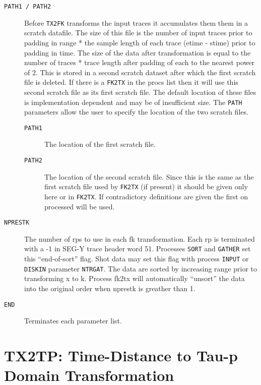 \begin{description}
\item[\texttt{PATH1 / PATH2}] Before \texttt{TX2FK} transforms the input traces it accumulates
         them them in a scratch datafile.  The size of this file is the
         number of input traces prior to padding in range * the sample
         length of each trace (etime - stime) prior to padding in time.
         The size of the data after transformation is equal to the number
         of traces * trace length after padding of each to the nearest
         power of 2. This is stored in a second scratch dataset after
         which the first scratch file is deleted. If there is a \texttt{FK2TX} in
         the procs list then it will use this second scratch file as its
         first scratch file.  The default location of these files is
         implementation dependent and may be of insufficient size. The
         \texttt{PATH} parameters allow the user to specify the location of the
         two scratch files.

\begin{description}
\item[\texttt{PATH1}] The location of the first scratch file.

\item[\texttt{PATH2}] The location of the second scratch file. Since this is the same as
         the first scratch file used by \texttt{FK2TX} (if present) it should be
         given only here or in \texttt{FK2TX}. If contradictory definitions are
         given the first on processed will be used.
\end{description}

\item[\texttt{NPRESTK}] The number of \glspl{rp} to use in each fk transformation.  Each \gls{rp} is
         terminated with a -1 in SEG-Y trace header word 51.  Processes
         \texttt{SORT} and \texttt{GATHER} set this ``end-of-sort'' flag.  Shot data may set
         this flag with process \texttt{INPUT} or \texttt{DISKIN} parameter \texttt{NTRGAT}.  The data
         are sorted by increasing range prior to transforming x to k.
         Process fk2tx will automatically ``unsort'' the data into the
         original order when nprestk is greather than 1.

\item[\texttt{END}] Terminates each parameter list.
\end{description}

\section{TX2TP: Time-Distance to Tau-p Domain Transformation}
\label{cmd_tx2tp}

